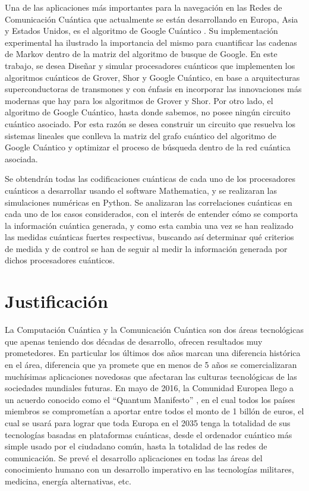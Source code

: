 Una de las aplicaciones más importantes para la navegación en las Redes de Comunicación Cuántica que actualmente se están desarrollando en Europa, Asia y Estados Unidos, es el algoritmo de Google Cuántico \cite{Paparo_2012, Paparo_2014}. Su implementación experimental \cite{Izaac_2017} ha ilustrado la importancia del mismo para cuantificar las cadenas de Markov dentro de la matriz del algoritmo de busque de Google. En este trabajo, se desea Diseñar y simular procesadores cuánticos que implementen los algoritmos cuánticos de Grover, Shor y Google Cuántico, en base a arquitecturas superconductoras de transmones y con énfasis en incorporar las innovaciones más modernas que hay para los algoritmos de Grover y Shor.  Por otro lado, el algoritmo de Google Cuántico, hasta donde sabemos, no posee ningún circuito cuántico asociado. Por esta razón se desea construir un circuito que resuelva los sistemas lineales que conlleva la matriz del grafo cuántico del algoritmo de Google Cuántico y optimizar el proceso de búsqueda dentro de la red cuántica asociada.

Se obtendrán todas las codificaciones cuánticas de cada uno de los procesadores cuánticos a desarrollar usando el software Mathematica, y se realizaran las simulaciones numéricas en Python. Se analizaran las correlaciones cuánticas en cada uno de los casos considerados, con el interés de entender cómo se comporta la información cuántica generada, y como esta cambia una vez se han realizado las medidas cuánticas fuertes respectivas, buscando así determinar qué criterios de medida y de control se han de seguir al medir la información generada por dichos procesadores cuánticos.

\section{Justificación}

La Computación Cuántica y la Comunicación Cuántica son dos áreas tecnológicas que apenas teniendo dos décadas de desarrollo, ofrecen resultados muy prometedores. En particular los últimos dos años marcan una diferencia histórica en el área, diferencia que ya promete que en menos de 5 años se comercializaran muchísimas aplicaciones novedosas que afectaran las culturas tecnológicas de las sociedades mundiales futuras. En mayo de 2016, la Comunidad Europea llego a un acuerdo conocido como el “Quantum Manifesto” \cite{int34}, en el cual todos los países miembros se comprometían a aportar entre todos el monto de 1 billón de euros, el cual se usará para lograr que toda Europa en el 2035 tenga la totalidad de sus tecnologías basadas en plataformas cuánticas, desde el ordenador cuántico más simple usado por el ciudadano común, hasta la totalidad de las redes de comunicación. Se prevé el desarrollo aplicaciones en todas las áreas del conocimiento humano con un desarrollo imperativo en las tecnologías militares, medicina, energía alternativas, etc.

